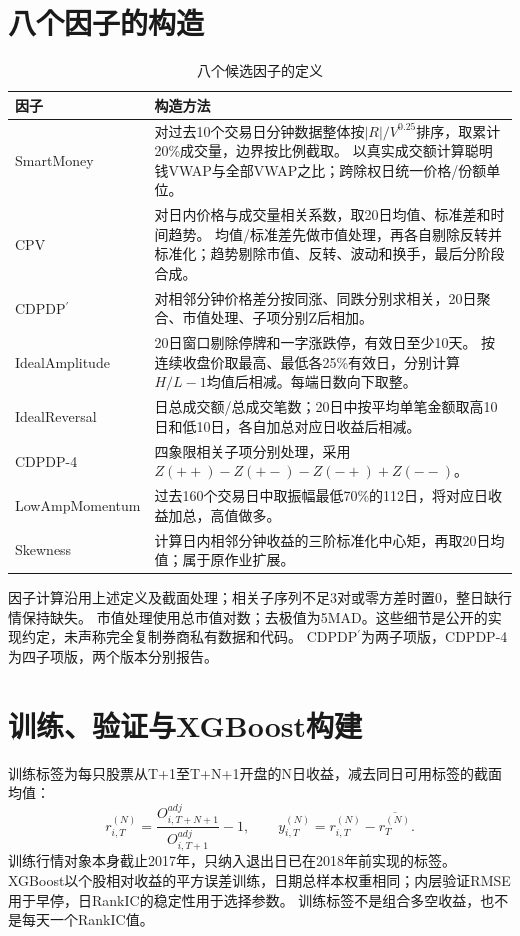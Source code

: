 \documentclass[10pt,compsoc,UTF8]{CjC}
\begin{document}
\section{八个因子的构造}
\begin{table}[H]\centering\normalsize
\caption{八个候选因子的定义}
\begin{tabularx}{\linewidth}{p{37mm}X}\toprule
因子 & 构造方法\\\midrule
SmartMoney & 对过去10个交易日分钟数据整体按$|R|/V^{0.25}$排序，取累计20\%成交量，边界按比例截取。
以真实成交额计算聪明钱VWAP与全部VWAP之比；跨除权日统一价格/份额单位。\\
CPV & 对日内价格与成交量相关系数，取20日均值、标准差和时间趋势。
均值/标准差先做市值处理，再各自剔除反转并标准化；趋势剔除市值、反转、波动和换手，最后分阶段合成。\\
CDPDP$^{\prime}$ & 对相邻分钟价格差分按同涨、同跌分别求相关，20日聚合、市值处理、子项分别Z后相加。\\
IdealAmplitude & 20日窗口剔除停牌和一字涨跌停，有效日至少10天。
按连续收盘价取最高、最低各25\%有效日，分别计算$H/L-1$均值后相减。每端日数向下取整。\\
IdealReversal & 日总成交额/总成交笔数；20日中按平均单笔金额取高10日和低10日，各自加总对应日收益后相减。\\
CDPDP-4 & 四象限相关子项分别处理，采用$Z(++)-Z(+-)-Z(-+)+Z(--)$。\\
LowAmpMomentum & 过去160个交易日中取振幅最低70\%的112日，将对应日收益加总，高值做多。\\
Skewness & 计算日内相邻分钟收益的三阶标准化中心矩，再取20日均值；属于原作业扩展。\\\bottomrule

\end{tabularx}\end{table}
因子计算沿用上述定义及截面处理；相关子序列不足3对或零方差时置0，整日缺行情保持缺失。
市值处理使用总市值对数；去极值为5MAD。这些细节是公开的实现约定，未声称完全复制券商私有数据和代码。
CDPDP$^{\prime}$为两子项版，CDPDP-4为四子项版，两个版本分别报告。

\clearpage
\section{训练、验证与XGBoost构建}
训练标签为每只股票从T+1至T+N+1开盘的N日收益，减去同日可用标签的截面均值：
\[
r_{i,T}^{(N)}=\frac{O^{adj}_{i,T+N+1}}{O^{adj}_{i,T+1}}-1,
\qquad y_{i,T}^{(N)}=r_{i,T}^{(N)}-\overline{r_T^{(N)}}.
\]
训练行情对象本身截止2017年，只纳入退出日已在2018年前实现的标签。
XGBoost以个股相对收益的平方误差训练，日期总样本权重相同；内层验证RMSE用于早停，日RankIC的稳定性用于选择参数。
训练标签不是组合多空收益，也不是每天一个RankIC值。
\end{document}
